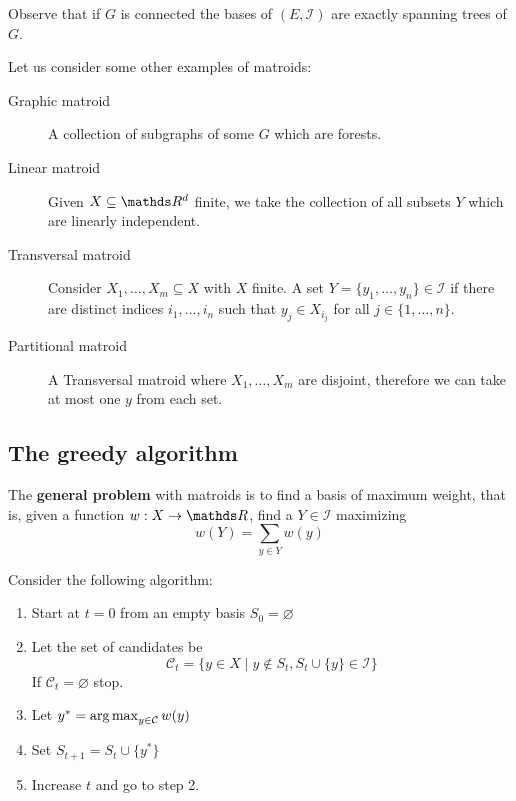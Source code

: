 \documentclass[12pt]{extarticle}
\begin{document}
Observe that if $G$ is connected the bases of $(E, \mathcal I)$ are exactly spanning trees of $G$.

Let us consider some other examples of matroids:
\begin{description}
	\item[Graphic matroid] A collection of subgraphs of some $G$ which are forests.
	\item[Linear matroid] Given $X \subseteq \R^d$ finite, we take the collection of all subsets $Y$
	      which are linearly independent.
	\item[Transversal matroid] Consider $X_1, \dots, X_m \subseteq X$ with $X$ finite. A set
	      $Y = \{y_1, \dots, y_n \} \in \mathcal I$ if there are distinct indices $i_1, \dots, i_n$ such
	      that $y_j \in X_{i_j}$ for all $j \in \{1, \dots, n\}$.

	\item[Partitional matroid] A Transversal matroid where $X_1, \dots, X_m$ are disjoint,
	      therefore we can take at most one $y$ from each set.
\end{description}

\subsection{The greedy algorithm}

The \textbf{general problem} with matroids is to find a basis of maximum weight, that is, given a
function $w: X \to \R$, find a $Y \in \mathcal I$ maximizing
\begin{equation}
	w(Y) = \sum_{y \in Y} w(y)
\end{equation}

Consider the following algorithm:
\begin{enumerate}
	\item Start at $t = 0$ from an empty basis $S_0 = \varnothing$
	\item Let the set of candidates be
	      \begin{equation}
		      \mathcal C_t = \{ y \in X \mid y \notin S_t, S_t \cup \{y\} \in \mathcal I \}
	      \end{equation}
	      If $\mathcal C_t = \varnothing$ stop.

	\item Let $y^* = \operatorname*{arg\,max}_{y \in \mathcal C} w(y)$
	\item Set $S_{t+1} = S_t \cup \{y^*\}$
	\item Increase $t$ and go to step 2.
\end{enumerate}
\end{document}
